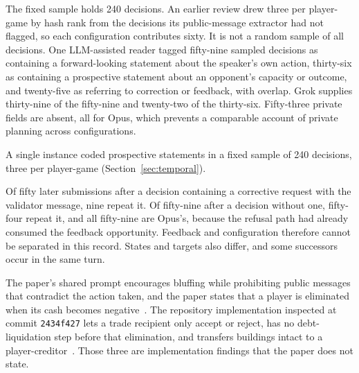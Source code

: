 The fixed sample holds 240 decisions. An earlier review drew three per player-game by hash rank from the decisions its public-message extractor had not flagged, so each configuration contributes sixty. It is not a random sample of all decisions. One LLM-assisted reader tagged fifty-nine sampled decisions as containing a forward-looking statement about the speaker's own action, thirty-six as containing a prospective statement about an opponent's capacity or outcome, and twenty-five as referring to correction or feedback, with overlap. Grok supplies thirty-nine of the fifty-nine and twenty-two of the thirty-six. Fifty-three private fields are absent, all for Opus, which prevents a comparable account of private planning across configurations.

A single instance coded prospective statements in a fixed sample of 240 decisions, three per player-game (Section~\ref{sec:temporal}).


Of fifty later submissions after a decision containing a corrective request with the validator message, nine repeat it. Of fifty-nine after a decision without one, fifty-four repeat it, and all fifty-nine are Opus's, because the refusal path had already consumed the feedback opportunity. Feedback and configuration therefore cannot be separated in this record. States and targets also differ, and some successors occur in the same turn.


The paper's shared prompt encourages bluffing while prohibiting public messages that contradict the action taken, and the paper states that a player is eliminated when its cash becomes negative~\cite[\S4, App.~A.2]{wu2026agentmonopoly}. The repository implementation inspected at commit \texttt{2434f427} lets a trade recipient only accept or reject, has no debt-liquidation step before that elimination, and transfers buildings intact to a player-creditor~\cite{agentmonopoly2026repo}. Those three are implementation findings that the paper does not state.

